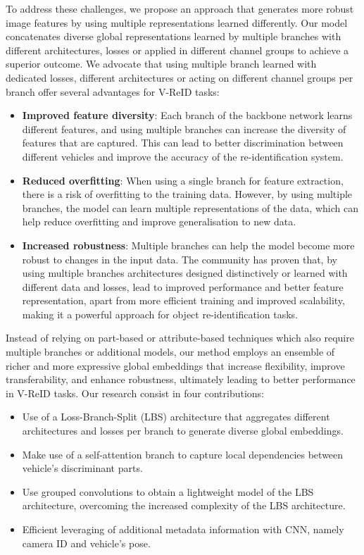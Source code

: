 \documentclass[letterpaper, 10pt, conference]{ieeeconf}
\begin{document}
To address these challenges, we propose an approach that generates more robust image features by using multiple representations learned differently. Our model concatenates diverse global representations learned by multiple branches with different architectures, losses  or applied in different channel groups to achieve a superior outcome. 
We advocate that using multiple branch learned with dedicated losses, different architectures or acting on different channel groups per branch offer several advantages for V-ReID tasks:
\begin{itemize}
\item \textbf{Improved feature diversity}: Each branch of the backbone network learns different features, and using multiple branches can increase the diversity of features that are captured. This can lead to better discrimination between different vehicles and improve the accuracy of the re-identification system.
\item \textbf{Reduced overfitting}: When using a single branch for feature extraction, there is a risk of overfitting to the training data. However, by using multiple branches, the model can learn multiple representations of the data, which can help reduce overfitting and improve generalisation to new data.
\item \textbf{Increased robustness}: Multiple branches can help the model become more robust to changes in the input data. The community has proven that, by using multiple branches architectures designed distinctively or learned with different data and losses, lead to improved performance and better feature representation, apart from more efficient training and improved scalability, making it a powerful approach for object re-identification tasks.


\end{itemize}
Instead of relying on part-based or attribute-based techniques which also require multiple branches or additional models, our method employs an ensemble of richer and more expressive global embeddings that increase flexibility, improve transferability, and enhance robustness, ultimately leading to better performance in V-ReID tasks. 
Our research consist in four contributions:
\begin{itemize}
    \item Use of a Loss-Branch-Split (LBS) architecture that aggregates different architectures and losses per branch to generate diverse global embeddings. 
    \item Make use of a self-attention branch to capture local dependencies between vehicle's discriminant parts.
    \item Use grouped convolutions to obtain a lightweight model of the LBS architecture, overcoming the increased complexity of the LBS architecture.

    \item Efficient leveraging of additional metadata information with CNN, namely camera ID and vehicle's pose.
\end{itemize}
\end{document}
